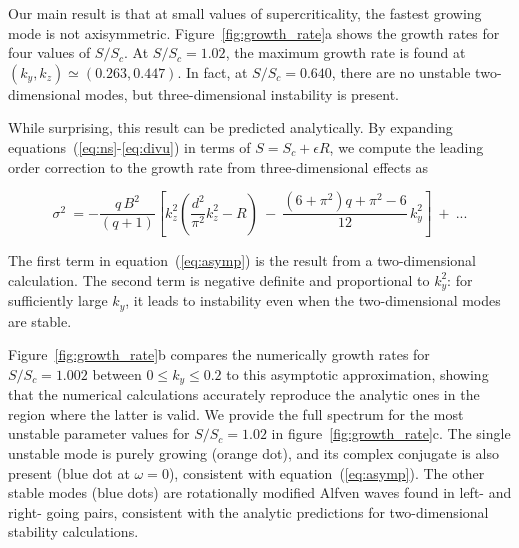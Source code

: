 \documentclass[aps,prl,reprint,superscriptaddress]{revtex4-1}
\newcommand{\SSC}{S/S_{c}}
\begin{document}
Our main result is that at small values of supercriticality, the fastest growing mode is not axisymmetric. 
Figure~\ref{fig:growth_rate}a shows the growth rates for four values of $\SSC$. 
At $\SSC = 1.02$, the maximum growth rate is found at $(k_y, k_z) \simeq (0.263, 0.447)$.
In fact, at $\SSC = 0.640$, there are no unstable two-dimensional modes, but three-dimensional instability is present.

While surprising, this result can be predicted analytically.
By expanding equations~(\ref{eq:ns}-\ref{eq:divu}) in terms of $S = S_c + \epsilon R$, we compute the leading order correction to the growth rate from three-dimensional effects as
\begin{widetext}
\begin{equation}
  \label{eq:asymp}
\sigma^{2} \ = -\frac{q\,B^{2}}{(q+1)} \left[ k_z^2 \left(\frac{d^2}{\pi^{2}} k_z^2-R\right) \ - \ \frac{\left(6+\pi ^2\right) q+\pi
   ^2-6}{12 } \, k_{y}^{2}  \right] \ + \ ...
\end{equation}
\end{widetext}
The first term in equation~(\ref{eq:asymp}) is the result from a two-dimensional calculation.
The second term is negative definite and proportional to $k_y^2$: for sufficiently large $k_y$, it leads to instability even when the two-dimensional modes are stable.

Figure~\ref{fig:growth_rate}b compares the numerically growth rates for $\SSC=1.002$ between $0 \le k_y \le 0.2$ to this asymptotic approximation, showing that the numerical calculations accurately reproduce the analytic ones in the region where the latter is valid.
We provide the full spectrum for the most unstable parameter values for $\SSC = 1.02$ in figure~\ref{fig:growth_rate}c.
The single unstable mode is purely growing (orange dot), and its complex conjugate is also present (blue dot at $\omega = 0$), consistent with equation~(\ref{eq:asymp}).
The other stable modes (blue dots) are rotationally modified Alfven waves found in left- and right- going pairs, consistent with the analytic predictions for two-dimensional stability calculations.
%
\onecolumngrid
\end{document}
